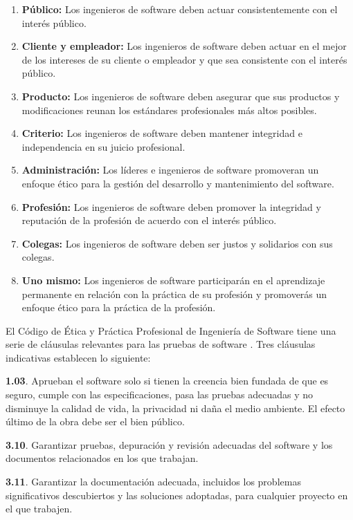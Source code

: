\documentclass[twoside]{article}
\begin{document}
\begin{multicols}{2}
\begin{enumerate}
\item \textbf{Público:} Los ingenieros de software deben actuar consistentemente
con el interés público.
\item \textbf{Cliente y empleador:} Los ingenieros de software deben actuar en
el mejor de los intereses de su cliente o empleador y que sea consistente con el
interés público.
\item \textbf{Producto:} Los ingenieros de software deben asegurar que sus
productos y modificaciones reunan los estándares profesionales más altos
posibles.
\item \textbf{Criterio:} Los ingenieros de software deben mantener integridad e
independencia en su juicio profesional.
\item \textbf{Administración:} Los líderes e ingenieros de software promoveran
un enfoque ético para la gestión del desarrollo y mantenimiento del software.
\item \textbf{Profesión:} Los ingenieros de software deben promover la
integridad y reputación de la profesión de acuerdo con el interés público.
\item \textbf{Colegas:} Los ingenieros de software deben ser justos y solidarios
con sus colegas.
\item \textbf{Uno mismo:} Los ingenieros de software participarán en el
aprendizaje permanente en relación con la práctica de su profesión y promoverás
un enfoque ético para la práctica de la profesión.
\end{enumerate}


El Código de Ética y Práctica Profesional de Ingeniería de Software tiene una
serie de cláusulas relevantes para las pruebas de software
\cite{rogerson2002software}. Tres cláusulas indicativas establecen lo siguiente:

\textbf{1.03}. Aprueban el software solo si tienen la creencia bien fundada de que es
seguro, cumple con las especificaciones, pasa las pruebas adecuadas y no
disminuye la calidad de vida, la privacidad ni daña el medio ambiente. El efecto
último de la obra debe ser el bien público.

\textbf{3.10}. Garantizar pruebas, depuración y revisión adecuadas del software
y los documentos relacionados en los que trabajan.

\textbf{3.11}. Garantizar la documentación adecuada, incluidos los problemas
significativos descubiertos y las soluciones adoptadas, para cualquier proyecto
en el que trabajen.


\end{multicols}
\end{document}
